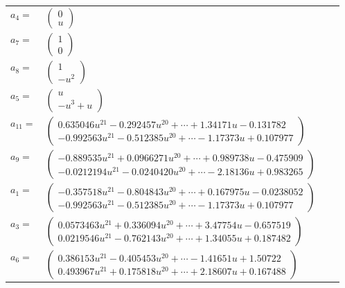 \documentclass[1p]{elsarticle_modified}
\theoremstyle{definition}
\begin{document}
\begin{tabular}{m{7pt} m{180pt} m{7pt} m{180pt} }
\flushright $a_{4}=$&$\begin{pmatrix}0\\u\end{pmatrix}$ \\
\flushright $a_{7}=$&$\begin{pmatrix}1\\0\end{pmatrix}$ \\
\flushright $a_{8}=$&$\begin{pmatrix}1\\- u^2\end{pmatrix}$ \\
\flushright $a_{5}=$&$\begin{pmatrix}u\\- u^3+u\end{pmatrix}$ \\
\flushright $a_{11}=$&$\begin{pmatrix}0.635046 u^{21}-0.292457 u^{20}+\cdots+1.34171 u-0.131782\\-0.992563 u^{21}-0.512385 u^{20}+\cdots-1.17373 u+0.107977\end{pmatrix}$ \\
\flushright $a_{9}=$&$\begin{pmatrix}-0.889535 u^{21}+0.0966271 u^{20}+\cdots+0.989738 u-0.475909\\-0.0212194 u^{21}-0.0240420 u^{20}+\cdots-2.18136 u+0.983265\end{pmatrix}$ \\
\flushright $a_{1}=$&$\begin{pmatrix}-0.357518 u^{21}-0.804843 u^{20}+\cdots+0.167975 u-0.0238052\\-0.992563 u^{21}-0.512385 u^{20}+\cdots-1.17373 u+0.107977\end{pmatrix}$ \\
\flushright $a_{3}=$&$\begin{pmatrix}0.0573463 u^{21}+0.336094 u^{20}+\cdots+3.47754 u-0.657519\\0.0219546 u^{21}-0.762143 u^{20}+\cdots+1.34055 u+0.187482\end{pmatrix}$ \\
\flushright $a_{6}=$&$\begin{pmatrix}0.386153 u^{21}-0.405453 u^{20}+\cdots-1.41651 u+1.50722\\0.493967 u^{21}+0.175818 u^{20}+\cdots+2.18607 u+0.167488\end{pmatrix}$ \\

\end{tabular}
\end{document}
